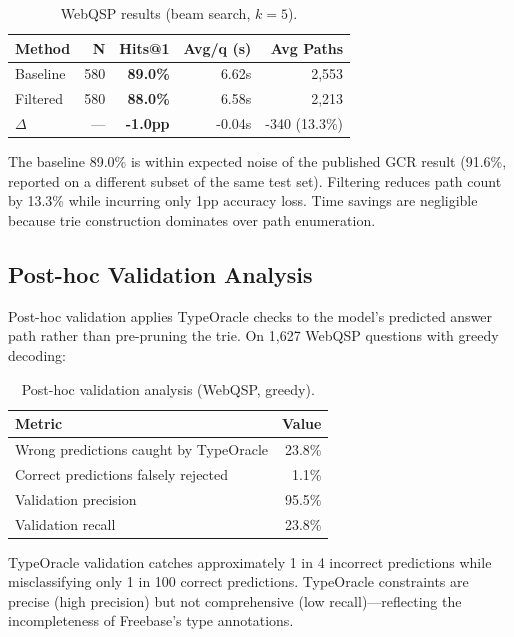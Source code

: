\documentclass[11pt,twoside]{article}
\begin{document}
\begin{table}[H]
  \centering
  \caption{WebQSP results (beam search, \(k=5\)).}
  \label{tab:webqsp-main}
  \begin{tabular}{lrrrr}
    \toprule
    \textbf{Method} & \textbf{N} & \textbf{Hits@1} & \textbf{Avg/q (s)} & \textbf{Avg Paths} \\
    \midrule
    Baseline & 580 & \textbf{89.0\%} & 6.62s & 2,553 \\
    Filtered & 580 & \textbf{88.0\%} & 6.58s & 2,213 \\
    \(\Delta\) & --- & \textbf{-1.0pp} & -0.04s & -340 (13.3\%) \\
    \bottomrule
  \end{tabular}
\end{table}

The baseline 89.0\% is within expected noise of the published GCR result
(91.6\%, reported on a different subset of the same test set). Filtering reduces
path count by 13.3\% while incurring only 1pp accuracy loss. Time savings are
negligible because trie construction dominates over path enumeration.

\subsection{Post-hoc Validation Analysis}

Post-hoc validation applies TypeOracle checks to the model's predicted answer
path rather than pre-pruning the trie. On 1,627 WebQSP questions with greedy
decoding:

\begin{table}[H]
  \centering
  \caption{Post-hoc validation analysis (WebQSP, greedy).}
  \label{tab:validate}
  \begin{tabular}{lr}
    \toprule
    \textbf{Metric} & \textbf{Value} \\
    \midrule
    Wrong predictions caught by TypeOracle & 23.8\% \\
    Correct predictions falsely rejected & 1.1\% \\
    Validation precision & 95.5\% \\
    Validation recall & 23.8\% \\
    \bottomrule
  \end{tabular}
\end{table}

TypeOracle validation catches approximately 1 in 4 incorrect predictions while
misclassifying only 1 in 100 correct predictions. TypeOracle constraints are
precise (high precision) but not comprehensive (low recall)---reflecting the
incompleteness of Freebase's type annotations.
\end{document}
